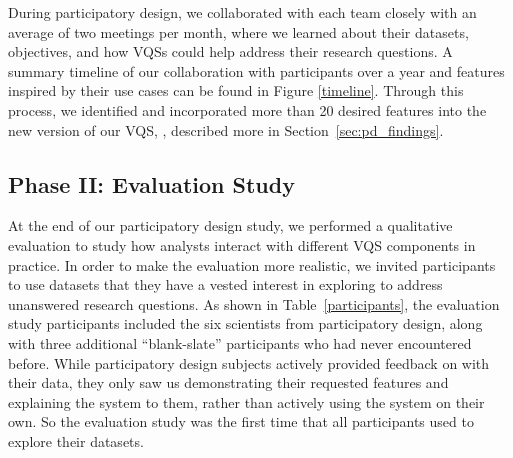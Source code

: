 \par During participatory design, we collaborated with each team closely with an average of two meetings per month, where we learned about their datasets, objectives, and how VQSs could help address their research questions. A summary timeline of our collaboration with participants over a year and features inspired by their use cases can be found in Figure \ref{timeline}.
Through this process, we identified and incorporated more than 20 desired features into the new version of our VQS, \zvpp, described more in Section~\ref{sec:pd_findings}.
\vspace{-10pt}
\subsection{Phase II: Evaluation Study}
At the end of our participatory design study, we performed a qualitative evaluation to study how analysts interact with different VQS components in practice. In order to make the evaluation more realistic, we invited participants to use datasets that they have a vested interest in exploring to address unanswered research questions. As shown in Table~\ref{participants}, the evaluation study participants included the six scientists from participatory design, along with three additional ``blank-slate'' participants who had never encountered \zvpp before. While participatory design subjects actively provided feedback on \zvpp with their data, they only saw us demonstrating their requested features and explaining the system to them, rather than actively using the system on their own. So the evaluation study was the first time that all participants used \zvpp to explore their datasets.
